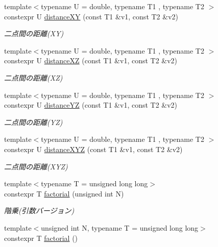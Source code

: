 \begin{DoxyCompactItemize}
{\footnotesize template$<$typename U  = double, typename T1 , typename T2 $>$ }\\constexpr U \mbox{\hyperlink{namespacesaki_ac7860b024b9f60e5d2426448504cdfa5}{distance\+XY}} (const T1 \&v1, const T2 \&v2)
\begin{DoxyCompactList}\small\item\em 二点間の距離(\+X\+Y) \end{DoxyCompactList}\item 
{\footnotesize template$<$typename U  = double, typename T1 , typename T2 $>$ }\\constexpr U \mbox{\hyperlink{namespacesaki_aa160b674649d86e048ff2676e20b0d25}{distance\+XZ}} (const T1 \&v1, const T2 \&v2)
\begin{DoxyCompactList}\small\item\em 二点間の距離(\+X\+Z) \end{DoxyCompactList}\item 
{\footnotesize template$<$typename U  = double, typename T1 , typename T2 $>$ }\\constexpr U \mbox{\hyperlink{namespacesaki_a430390838f23403a3efc4182aed002b1}{distance\+YZ}} (const T1 \&v1, const T2 \&v2)
\begin{DoxyCompactList}\small\item\em 二点間の距離(\+Y\+Z) \end{DoxyCompactList}\item 
{\footnotesize template$<$typename U  = double, typename T1 , typename T2 $>$ }\\constexpr U \mbox{\hyperlink{namespacesaki_aca24fd78c511e7ccd8f14a9c04eff7e9}{distance\+X\+YZ}} (const T1 \&v1, const T2 \&v2)
\begin{DoxyCompactList}\small\item\em 二点間の距離(\+X\+Y\+Z) \end{DoxyCompactList}\item 
{\footnotesize template$<$typename T  = unsigned long long$>$ }\\constexpr T \mbox{\hyperlink{namespacesaki_a59cd7e099937e5f8bcf5aa612745690c}{factorial}} (unsigned int N)
\begin{DoxyCompactList}\small\item\em 階乗(引数バージョン) \end{DoxyCompactList}\item 
{\footnotesize template$<$unsigned int N, typename T  = unsigned long long$>$ }\\constexpr T \mbox{\hyperlink{namespacesaki_a9dead910b791cee99cf82d1bd2a5d90c}{factorial}} ()

\end{DoxyCompactItemize}
